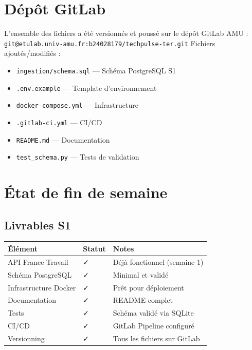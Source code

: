 \documentclass[12pt, a4paper]{article}
\begin{document}
\section{Dépôt GitLab}
L'ensemble des fichiers a été versionnés et poussé sur le dépôt GitLab AMU :
\texttt{git@etulab.univ-amu.fr:b24028179/techpulse-ter.git}
Fichiers ajoutés/modifiés :
\begin{itemize}
    \item \texttt{ingestion/schema.sql} — Schéma PostgreSQL S1
    \item \texttt{.env.example} — Template d'environnement
    \item \texttt{docker-compose.yml} — Infrastructure
    \item \texttt{.gitlab-ci.yml} — CI/CD
    \item \texttt{README.md} — Documentation
    \item \texttt{test\_schema.py} — Tests de validation
\end{itemize}
\section{État de fin de semaine}
\subsection{Livrables S1}
\begin{center}
\begin{tabular}{p{5cm} p{2cm} p{4cm}}
\toprule
\textbf{Élément} & \textbf{Statut} & \textbf{Notes} \\
\midrule
API France Travail & ✓ & Déjà fonctionnel (semaine 1) \\
Schéma PostgreSQL & ✓ & Minimal et validé \\
Infrastructure Docker & ✓ & Prêt pour déploiement \\
Documentation & ✓ & README complet \\
Tests & ✓ & Schéma validé via SQLite \\
CI/CD & ✓ & GitLab Pipeline configuré \\
Versionning & ✓ & Tous les fichiers sur GitLab \\
\bottomrule
\end{tabular}
\end{center}
\end{document}
